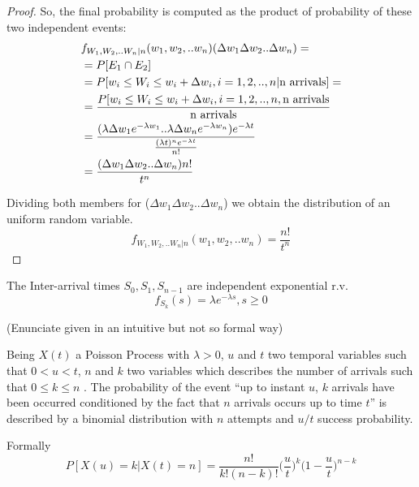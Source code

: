 \begin{theorem}
\begin{proof}
		So, the final probability is computed as the product of probability of these two independent events:
		\begin{equation}
			\begin{split}
				& f_{W_1,W_2,..W_n|n} (w_1,w_2,..w_n)( \Delta w_1\Delta w_2..\Delta w_n) = \\
				& =P[E_1 \cap E_2 ]\\
				& =P[w_i\leq W_i \leq w_i+\Delta w_i, i=1,2,..,n| \textnormal{n arrivals}]=\\
				& =\frac{P[w_i\leq W_i \leq w_i+\Delta w_i, i=1,2,..,n,\textnormal{n arrivals}}{\textnormal{n arrivals}}\\
				& =\frac{(\lambda \Delta w_1 e^{-\lambda w_1}..\lambda \Delta w_n e^{-\lambda w_n})e^{-\lambda t}}{\frac{(\lambda t)^{n}e^{-\lambda t}} {n!}}\\
				& =\frac{ (\Delta w_1 \Delta w_2.. \Delta w_n) n!}{t^n}
			\end{split}
		\end{equation}

		Dividing both members for ($\Delta w_1 \Delta w_2 .. \Delta w_n$) we obtain the distribution of an uniform random variable.
		\begin{equation}
			f_{W_1,W_2,..W_n|n} (w_1,w_2,..w_n) =\frac{n!}{t^n}
		\end{equation}
	\end{proof}
\end{theorem}

\begin{theorem}
	The Inter-arrival times $S_0,S_1, S_{n-1}$ are independent exponential r.v.
	\begin{equation}
		f_{S_k}(s)=\lambda e^{-\lambda s}, s \ge 0
	\end{equation}
\end{theorem}

\begin{theorem}
	(Enunciate given in an intuitive but not so formal way)

	Being $X(t)$ a Poisson Process with $\lambda>0$, $u$ and $t$ two temporal variables such that $0<u<t$, $n$ and $k$ two variables which describes the number of arrivals such that $0\leq k\leq n$ . The probability of the event ``up to instant $u$, $k$ arrivals have been occurred conditioned by the fact that $n$ arrivals occurs up to time $t$'' is described by a binomial distribution with $n$ attempts and $u/t$ success probability.

	Formally
	\begin{equation}
		P[X(u)=k|X(t)=n]= \frac{n!}{k!(n-k)!}\bigg(\frac{u}{t}\bigg)^k\bigg(1-\frac{u}{t}\bigg)^{n-k}
	\end{equation}
\end{theorem}

